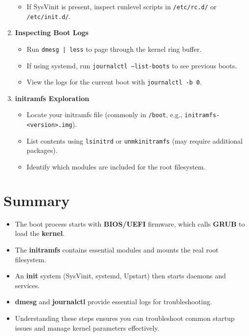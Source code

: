 \documentclass[a4paper]{report}
\begin{document}
\begin{enumerate}
\begin{itemize}
        \item If SysVinit is present, inspect runlevel scripts in \texttt{/etc/rc.d/} or \texttt{/etc/init.d/}.
    \end{itemize}
    \item \textbf{Inspecting Boot Logs}
    \begin{itemize}
        \item Run \texttt{dmesg | less} to page through the kernel ring buffer.
        \item If using systemd, run \texttt{journalctl --list-boots} to see previous boots.
        \item View the logs for the current boot with \texttt{journalctl -b 0}.
    \end{itemize}
    \item \textbf{initramfs Exploration}
    \begin{itemize}
        \item Locate your initramfs file (commonly in \texttt{/boot}, e.g., \texttt{initramfs-<version>.img}).
        \item List contents using \texttt{lsinitrd} or \texttt{unmkinitramfs} (may require additional packages).
        \item Identify which modules are included for the root filesystem.
    \end{itemize}
\end{enumerate}

\section*{Summary}
\begin{itemize}
    \item The boot process starts with \textbf{BIOS/UEFI} firmware, which calls \textbf{GRUB} to load the \textbf{kernel}.
    \item The \textbf{initramfs} contains essential modules and mounts the real root filesystem.
    \item An \textbf{init} system (SysVinit, systemd, Upstart) then starts daemons and services.
    \item \textbf{dmesg} and \textbf{journalctl} provide essential logs for troubleshooting.
    \item Understanding these steps ensures you can troubleshoot common startup issues and manage kernel parameters effectively.
\end{itemize}
\end{document}
